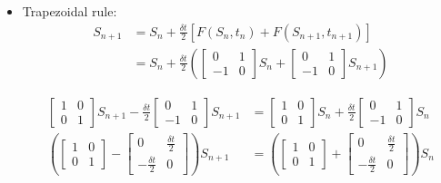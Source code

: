 \documentclass[a4paper,11pt]{report}
\begin{document}
\begin{enumerate}
\begin{itemize}
    \item Trapezoidal rule:
    \begin{equation*}
    \begin{aligned}
    S_{n+1} &= S_{n} + \frac{\delta t}{2} \left[ F(S_{n}, t_{n}) + F(S_{n+1}, t_{n+1}) \right] \\
            &= S_{n} + \frac{\delta t}{2} \left( \begin{bmatrix} 0 & 1 \\ -1 & 0 \end{bmatrix} S_{n} + \begin{bmatrix} 0 & 1 \\ -1 & 0 \end{bmatrix} S_{n+1} \right)
    \end{aligned}
    \end{equation*}
     
    \begin{equation*}
    \begin{aligned}
    \begin{bmatrix} 1 & 0 \\ 0 & 1 \end{bmatrix} S_{n+1} - \frac{\delta t}{2} \begin{bmatrix} 0 & 1 \\ -1 & 0 \end{bmatrix} S_{n+1} &= \begin{bmatrix} 1 & 0 \\ 0 & 1 \end{bmatrix} S_{n} + \frac{\delta t}{2} \begin{bmatrix} 0 & 1 \\ -1 & 0 \end{bmatrix} S_{n} \\
    \left( \begin{bmatrix} 1 & 0 \\ 0 & 1 \end{bmatrix} - \begin{bmatrix} 0 & \frac{\delta t}{2} \\ -\frac{\delta t}{2} & 0 \end{bmatrix} \right) S_{n+1} &= \left( \begin{bmatrix} 1 & 0 \\ 0 & 1 \end{bmatrix} + \begin{bmatrix} 0 & \frac{\delta t}{2} \\ -\frac{\delta t}{2} & 0 \end{bmatrix} \right) S_{n}
    \end{aligned}
    \end{equation*}


\end{itemize}
\end{enumerate}
\end{document}
